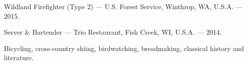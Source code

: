 Wildland Firefighter (Type 2) --- U.S. Forest Service, Winthrop, WA, U.S.A. --- 2015.

Server \& Bartender --- Trio Restaurant, Fish Creek, WI, U.S.A. --- 2014.


 	Bicycling, cross-country skiing, birdwatching, breadmaking, classical history and literature.